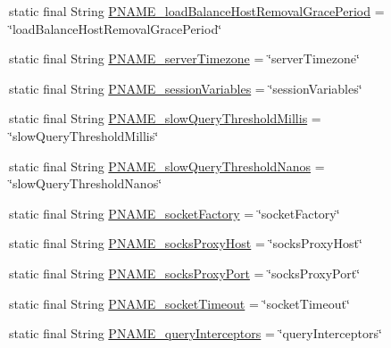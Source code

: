 \begin{DoxyCompactItemize}
\item 
static final String \mbox{\hyperlink{classcom_1_1mysql_1_1cj_1_1conf_1_1_property_definitions_ab30ebba7896dc536afffbaca33a44b96}{P\+N\+A\+M\+E\+\_\+load\+Balance\+Host\+Removal\+Grace\+Period}} = \char`\"{}load\+Balance\+Host\+Removal\+Grace\+Period\char`\"{}
\item 
static final String \mbox{\hyperlink{classcom_1_1mysql_1_1cj_1_1conf_1_1_property_definitions_af92182b1c357d44c7482196cb9f3247a}{P\+N\+A\+M\+E\+\_\+server\+Timezone}} = \char`\"{}server\+Timezone\char`\"{}
\item 
static final String \mbox{\hyperlink{classcom_1_1mysql_1_1cj_1_1conf_1_1_property_definitions_a9f08055b35bffcb6fa94fd82aaefd4ac}{P\+N\+A\+M\+E\+\_\+session\+Variables}} = \char`\"{}session\+Variables\char`\"{}
\item 
static final String \mbox{\hyperlink{classcom_1_1mysql_1_1cj_1_1conf_1_1_property_definitions_ae88a78706313fc90ec04ac225dcacfe0}{P\+N\+A\+M\+E\+\_\+slow\+Query\+Threshold\+Millis}} = \char`\"{}slow\+Query\+Threshold\+Millis\char`\"{}
\item 
static final String \mbox{\hyperlink{classcom_1_1mysql_1_1cj_1_1conf_1_1_property_definitions_a77a73467a94603871728ca7979cc6474}{P\+N\+A\+M\+E\+\_\+slow\+Query\+Threshold\+Nanos}} = \char`\"{}slow\+Query\+Threshold\+Nanos\char`\"{}
\item 
static final String \mbox{\hyperlink{classcom_1_1mysql_1_1cj_1_1conf_1_1_property_definitions_a04db99acec79f982d83d20dd766a7dc4}{P\+N\+A\+M\+E\+\_\+socket\+Factory}} = \char`\"{}socket\+Factory\char`\"{}
\item 
static final String \mbox{\hyperlink{classcom_1_1mysql_1_1cj_1_1conf_1_1_property_definitions_aee6b14bb9da0b62ca684d46a4f477067}{P\+N\+A\+M\+E\+\_\+socks\+Proxy\+Host}} = \char`\"{}socks\+Proxy\+Host\char`\"{}
\item 
static final String \mbox{\hyperlink{classcom_1_1mysql_1_1cj_1_1conf_1_1_property_definitions_ac9626df9025368ed3eaaae8bfde4d915}{P\+N\+A\+M\+E\+\_\+socks\+Proxy\+Port}} = \char`\"{}socks\+Proxy\+Port\char`\"{}
\item 
static final String \mbox{\hyperlink{classcom_1_1mysql_1_1cj_1_1conf_1_1_property_definitions_a944af4a86c59171d65778610717e9b31}{P\+N\+A\+M\+E\+\_\+socket\+Timeout}} = \char`\"{}socket\+Timeout\char`\"{}
\item 
static final String \mbox{\hyperlink{classcom_1_1mysql_1_1cj_1_1conf_1_1_property_definitions_a5b4a9bb8cb74fb15dc42cacea128dfc1}{P\+N\+A\+M\+E\+\_\+query\+Interceptors}} = \char`\"{}query\+Interceptors\char`\"{}

\end{DoxyCompactItemize}

